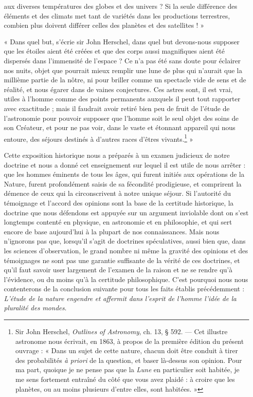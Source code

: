 \documentclass[a4paper, 11pt, oneside, landscape]{article}
\begin{document}
aux diverses températures des globes et des univers ? Si la seule différence des éléments et des climats met tant de variétés dans les productions terrestres, combien plus doivent différer celles des planètes et des satellites ! »

« Dans quel but, s'écrie sir John Herschel, dans quel but devons-nous supposer que les étoiles aient été créées et que des corps aussi magnifiques aient été dispersés dans l'immensité de l'espace ? Ce n'a pas été sans doute pour éclairer nos nuits, objet que pourrait mieux remplir une lune de plus qui n'aurait que la millième partie de la nôtre, ni pour briller comme un spectacle vide de sens et de réalité, et nous égarer dans de vaines conjectures. Ces astres sont, il est vrai, utiles à l'homme comme des points permanents auxquels il peut tout rapporter avec exactitude ; mais il faudrait avoir retiré bien peu de fruit de l'étude de l'astronomie pour pouvoir supposer que l'homme soit le seul objet des soins de son Créateur, et pour ne pas voir, dans le vaste et étonnant appareil qui nous entoure, des séjours destinés à d'autres races d'êtres vivants.\footnote{Sir John Herschel, \emph{Outlines of Astronomy}, ch. 13, § 592. --- Cet illustre astronome nous écrivait, en 1863, à propos de la première édition du présent ouvrage : « Dans un sujet de cette nature, chacun doit être conduit à tirer des probabilités \emph{à priori} de la question, et baser là-dessus son opinion. Pour ma part, quoique je ne pense pas que la \emph{Lune} en particulier soit habitée, je me sens fortement entraîné du côté que vous avez plaidé : à croire que les planètes, ou au moins plusieurs d'entre elles, sont habitées. »} »

Cette exposition historique nous a préparés à un examen judicieux de notre doctrine et nous a donné cet enseignement sur lequel il est utile de nous arrêter : que les hommes éminents de tous les âges, qui furent initiés aux opérations de la Nature, furent profondément saisis de sa fécondité prodigieuse, et comprirent la démence de ceux qui la circonscrivent à notre unique séjour. Si l'autorité du témoignage et l'accord des opinions sont la base de la certitude historique, la doctrine que nous défendons est appuyée sur un argument inviolable dont on s'est longtemps contenté en physique, en astronomie et en philosophie, et qui sert encore de base aujourd'hui à la plupart de nos connaissances. Mais nous n'ignorons pas que, lorsqu'il s'agit de doctrines spéculatives, aussi bien que, dans les sciences d'observation, le grand nombre ni même la gravité des opinions et des témoignages ne sont pas une garantie suffisante de la vérité de ces doctrines, et qu'il faut savoir user largement de l'examen de la raison et ne se rendre qu'à l'évidence, ou du moins qu'à la certitude philosophique. C'est pourquoi nous nous contenterons de la conclusion suivante pour tous les faits établis précédemment : \emph{L'étude de la nature engendre et affermit dans l'esprit de l'homme l'idée de la pluralité des mondes}.
\end{document}
